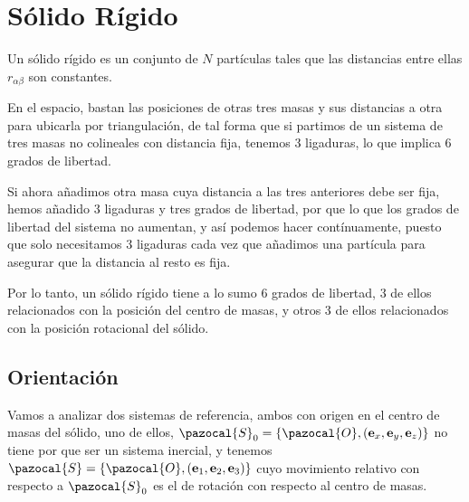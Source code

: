 \chapter{Sólido Rígido} 
Un sólido rígido es un conjunto de $N$ partículas tales que las distancias entre ellas $r_{\alpha \beta}$ son constantes.

En el espacio, bastan las posiciones de otras tres masas y sus distancias a otra para ubicarla por triangulación, de tal forma que si partimos de un sistema de tres masas no colineales con distancia fija, tenemos 3 ligaduras, lo que implica 6 grados de libertad.

Si ahora añadimos otra masa cuya distancia a las tres anteriores debe ser fija, hemos añadido 3 ligaduras y tres grados de libertad, por que lo que los grados de libertad del sistema no aumentan, y así podemos hacer contínuamente, puesto que solo necesitamos 3 ligaduras cada vez que añadimos una partícula para asegurar que la distancia al resto es fija.

Por lo tanto, un sólido rígido tiene a lo sumo 6 grados de libertad, 3 de ellos relacionados con la posición del centro de masas, y otros 3 de ellos relacionados con la posición rotacional del sólido.
\section{Orientación}
Vamos a analizar dos sistemas de referencia, ambos con origen en el centro de masas del sólido, uno de ellos, $\pazocal{S}_0 = \left\{\pazocal{O},(\mathbf{e}_x,\mathbf{e}_y,\mathbf{e}_z)\right\}$ no tiene por que ser un sistema inercial, y tenemos $\pazocal{S} = \left\{\pazocal{O},(\mathbf{e}_1,\mathbf{e}_2,\mathbf{e}_3)\right\}$ cuyo movimiento relativo con respecto a $\pazocal{S}_0$ es el de rotación con respecto al centro de masas.

